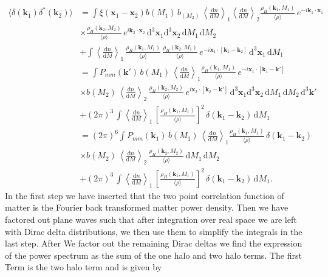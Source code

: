 \documentclass[oneside]{book}
\newcommand*{\rd}{\mathrm{d}}
\begin{document}
\begin{align}
    \langle \delta(\boldsymbol{k}_1)\delta^*(\boldsymbol{k}_2)\rangle &=  \int \xi(\boldsymbol{x}_1-\boldsymbol{x}_2) b(M_1)\, b_(M_2)\, \left\langle \frac{\rd n}{\rd M} \right\rangle_1\!\!\left\langle \frac{\rd n}{\rd M} \right\rangle_2 \!\!\frac{\rho_H(\boldsymbol{k}_1,M_1)}{\langle \rho \rangle}\,e^{-i\boldsymbol{k}_1\cdot\boldsymbol{x}_1} \nonumber \\
    &\times \frac{\rho_H(\boldsymbol{k}_2,M_2)}{\langle \rho \rangle}\,e^{i\boldsymbol{k}_2\cdot\boldsymbol{x}_2} \, \rd^3{\boldsymbol{x}}_1 \rd^3{\boldsymbol{x}}_2 \,\rd M_1\,\rd M_2 \nonumber\\
    &+\int \left\langle \frac{\rd n}{\rd M} \right\rangle_1\,\frac{\rho_H(\boldsymbol{k}_1,M_1)}{\langle \rho \rangle}\,\frac{\rho_H(\boldsymbol{k}_2,M_1)}{\langle \rho \rangle}\,e^{-i\boldsymbol{x}_1\cdot[\boldsymbol{k}_1-\boldsymbol{k}_2]} \,\rd^3 \boldsymbol{x}_1 \,\rd M_1 \\
    &=  \int P_{mm}(\boldsymbol{k}') \, b(M_1)\, \left\langle \frac{\rd n}{\rd M} \right\rangle_1 \frac{\rho_H(\boldsymbol{k}_1,M_1)}{\langle \rho \rangle}\,e^{-i \boldsymbol{x}_1\cdot[\boldsymbol{k}_1-\boldsymbol{k}']} \nonumber \\
    &\times  b(M_2)\,\left\langle\frac{\rd n}{\rd M} \right\rangle_2\,\frac{\rho_H(\boldsymbol{k}_2,M_2)}{\langle \rho \rangle}\,e^{i\boldsymbol{x}_2\cdot[\boldsymbol{k}_2-\boldsymbol{k}']} \, \rd^3{\boldsymbol{x}}_1 \rd^3{\boldsymbol{x}}_2 \,\rd M_1\,\rd M_2\,\rd^3\boldsymbol{k}' \nonumber\\
    &+(2\pi)^3\,\int \left\langle \frac{\rd n}{\rd M} \right\rangle_1\,\left[\frac{\rho_H(\boldsymbol{k}_1,M_1)}{\langle \rho \rangle}\right]^2\,\delta(\boldsymbol{k}_1-\boldsymbol{k}_2) \,\rd M_1 \\
    &= (2\pi)^6 \int P_{mm}(\boldsymbol{k}_1) \, b(M_1)\, \left\langle \frac{\rd n}{\rd M} \right\rangle_1 \frac{\rho_H(\boldsymbol{k}_1,M_1)}{\langle \rho \rangle}\,\delta(\boldsymbol{k}_1-\boldsymbol{k}_2) \nonumber \\
    &\times  b(M_2)\,\left\langle\frac{\rd n}{\rd M} \right\rangle_2\,\frac{\rho_H(\boldsymbol{k}_2,M_2)}{\langle \rho \rangle} \,\rd M_1\,\rd M_2\nonumber\\
    &+(2\pi)^3\,\int \left\langle \frac{\rd n}{\rd M} \right\rangle_1\,\left[\frac{\rho_H(\boldsymbol{k}_1,M_1)}{\langle \rho \rangle}\right]^2\,\delta(\boldsymbol{k}_1-\boldsymbol{k}_2)\,\rd M_1.
\end{align}
In the first step we have inserted that the two point correlation function of matter is the Fourier back transformed matter power density. Then we have factored out plane waves such that after integration over real space we are left with Dirac delta distributions, we then use them to simplify the integrals in the last step. After We factor out the remaining Dirac deltas we find the expression of the power spectrum as the sum of the one halo and two halo terms. The first Term is the two halo term and is given by 
\end{document}
